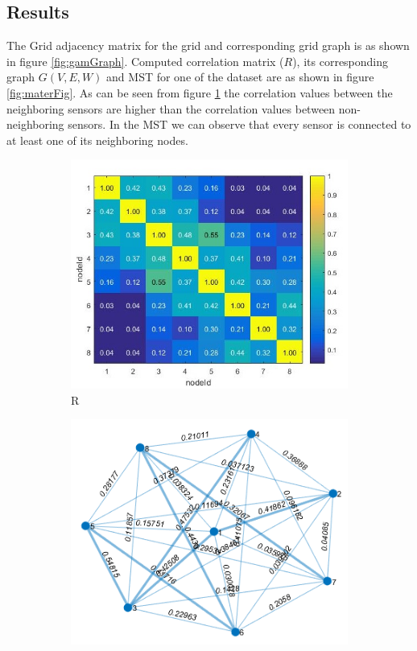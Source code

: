\subsection{Results}
The Grid adjacency matrix for the grid and corresponding grid graph is as shown in figure \ref{fig:gamGraph}. Computed correlation matrix ($R$), its corresponding graph $G(V,E,W)$ and MST for one of the dataset are as shown in figure \ref{fig:materFig}. 
As can be seen from figure \ref{fig:corrMatrix} the correlation values between the neighboring sensors are higher than the correlation values between non-neighboring sensors. In the MST we can observe that every sensor is connected to at least one of its neighboring nodes.

\begin{figure}[!ht]
\begin{subfigure}[b]{\textwidth}
\includegraphics[scale=0.75]{./pics/correlation.jpg}
\caption{R}
\centering
\label{fig:corrMatrix}
\end{subfigure}
\hfill
\begin{subfigure}[b]{0.5\textwidth}
\includegraphics[scale=0.5]{./pics/corrTree.jpg}

\end{subfigure}
\end{figure}
